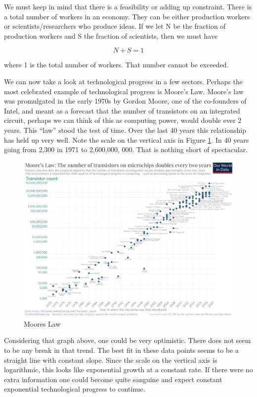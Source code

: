 \documentclass[
]{book}
\begin{document}
We must keep in mind that there is a feasibility or adding up constraint. There is a total number of workers in an economy. They can be either production workers or scientists/researchers who produce ideas. If we let N be the fraction of production workers and S the fraction of scientists, then we must have

\[ N + S = 1 \]

where 1 is the total number of workers. That number cannot be exceeded.

We can now take a look at technological progress in a few sectors. Perhaps the most celebrated example of technological progress is Moore's Law. Moore's law was promulgated in the early 1970s by Gordon Moore, one of the co-founders of Intel, and meant as a forecast that the number of transistors on an integrated circuit, perhaps we can think of this as computing power, would double ever 2 years. This ``law'' stood the test of time. Over the last 40 years this relationship has held up very well. Note the scale on the vertical axis in Figure \ref{fig:growth15}. In 40 years going from 2,300 in 1971 to 2,600,000, 000. That is nothing short of spectacular.

\begin{figure}

{\centering \includegraphics[width=1\linewidth]{img/growth/moore15} 

}

\caption{Moores Law}\label{fig:growth15}
\end{figure}

Considering that graph above, one could be very optimistic. There does not seem to be any break in that trend. The best fit in these data points seems to be a straight line with constant slope. Since the scale on the vertical axis is logarithmic, this looks like exponential growth at a constant rate. If there were no extra information one could become quite sanguine and expect constant exponential technological progress to continue.
\end{document}

